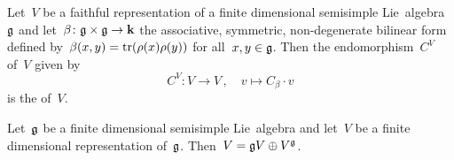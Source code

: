 \begin{definition}
  \label{casimir endomorphism of a faithful representation}
  Let~$V$ be a faithful representation of a finite dimensional semisimple Lie~algebra~$\mathfrak{g}$ and let~$\beta \colon \mathfrak{g} \times \mathfrak{g} \to \mathbf{k}$ the associative, symmetric, non-degenerate bilinear form defined by~$\beta(x,y) = \operatorname{tr}(\rho(x)\rho(y))$ for all~$x,y \in \mathfrak{g}$.
  Then the endomorphism~$C^V$ of~$V$ given by
  \[
    C^V
    \colon
    V
    \to
    V \,,
    \quad
    v
    \mapsto
    C_\beta \cdot v
  \]
  is the  of~$V$.
\end{definition}
 

\begin{proposition}
  \label{decomposition of representations of semisimple lie algebras}
  Let~$\mathfrak{g}$ be a finite dimensional semisimple Lie~algebra and let~$V$ be a finite dimensional representation of~$\mathfrak{g}$.
  Then~$V = \mathfrak{g} V \oplus V^{\mathfrak{g}}$.
\end{proposition}


